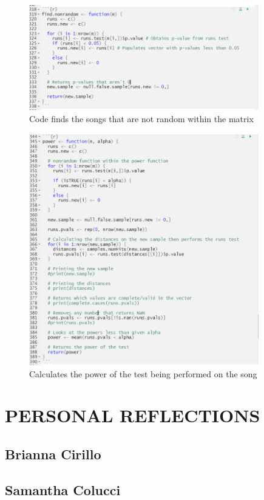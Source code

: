 \documentclass[12pt, letterpaper]{article}
\begin{document}
\begin{figure}
\centering
\includegraphics[width=10cm]{FindNonRandomCode.png}
\caption{Code finds the songs that are not random within the matrix}
\label{fig: Find Nonrandom Songs Code}
\end{figure}

\begin{figure}
\centering
\includegraphics[width=10cm]{PowerCode.png}
\caption{Calculates the power of the test being performed on the song}
\label{fig: Power Code}
\end{figure}


\section{PERSONAL REFLECTIONS}
\subsection{Brianna Cirillo}
\subsection{Samantha Colucci}
\end{document}
